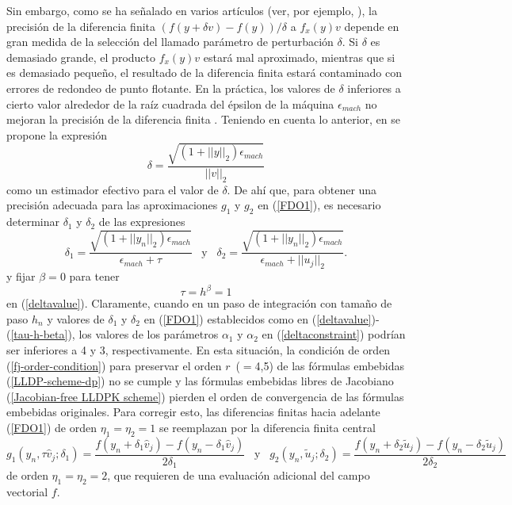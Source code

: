 Sin embargo, como se ha señalado en varios artículos (ver, por ejemplo, \cite{chan1984nonlinearly,knoll2004jacobian}), la precisión de la diferencia finita $(f(y+\delta v)-f(y))/ \delta$ a $f_x(y)v$ depende en gran medida de la selección del llamado parámetro de perturbación $\delta$. Si $\delta$ es demasiado grande, el producto $f_x(y)v$ estará mal aproximado, mientras que si es demasiado pequeño, el resultado de la diferencia finita estará contaminado con errores de redondeo de punto flotante. En la práctica, los valores de $\delta$ inferiores a cierto valor alrededor de la raíz cuadrada del épsilon de la máquina  $\epsilon_{mach}$ no mejoran la precisión de la diferencia finita \cite{knoll2004jacobian}.
Teniendo en cuenta lo anterior, en \cite{knoll2004jacobian} se propone la expresión
\[ \delta = \frac{\sqrt{(1+||y||_2)\epsilon_{mach}}}{||v||_2} \]
como un estimador efectivo para el valor de $\delta$. De ahí que, para obtener una precisión adecuada para las aproximaciones $g_1$ y $g_2$ en (\ref{FDO1}), es necesario determinar $\delta_1$ y $\delta_2$ de las expresiones
\begin{equation} \label{deltavalue}
	\delta_1 = \frac{\sqrt{(1+||y_n||_2)\epsilon_{mach}}}{\epsilon_{mach}+\tau}
	\;\;\; \text{y} \;\;\; \delta_2 = \frac{\sqrt{(1+||y_n||_2)\epsilon_{mach}}}{\epsilon_{mach}+||u_j||_2}.
\end{equation}
y fijar $\beta=0$ para tener
\begin{equation}
	\tau = h^\beta=1 \label{tau-h-beta}
\end{equation}
en (\ref{deltavalue}). Claramente, cuando en un paso de integración con tamaño de paso $h_n$ y valores de $\delta_1$ y $\delta_2$ en (\ref{FDO1}) establecidos como en (\ref{deltavalue})-(\ref{tau-h-beta}), los valores de los parámetros $ \alpha_1$ y $\alpha_2$ en (\ref{deltaconstraint}) podrían ser inferiores a 4 y 3, respectivamente. En esta situación, la condición de orden (\ref{fj-order-condition}) para preservar el orden $r$~($=$4,5) de las fórmulas embebidas (\ref{LLDP-scheme-dp}) no se cumple y las fórmulas embebidas libres de Jacobiano (\ref{Jacobian-free LLDPK scheme}) pierden el orden de convergencia de las fórmulas embebidas originales. Para corregir esto, las diferencias finitas hacia adelante (\ref{FDO1}) de orden $\eta_1=\eta_2=1$ se reemplazan por la diferencia finita central
\begin{equation*}
	g_1(y_n,\tau \widehat{v}_j;\delta_1)=\frac{f(y_n+\delta_1\widehat{v}_j)-f(y_n-\delta_1 \widehat{v}_j)}{2\delta_1}  \;\;\; \text{y} \;\;\; g_2(y_n,\widetilde{u}_j;\delta_2)=\frac{f(y_n+\delta_2  \widetilde{u}_j)-f(y_n-\delta_2 \widetilde{u}_j)}{2\delta_2}
\end{equation*}
de orden $\eta_1=\eta_2=2$, que requieren de una evaluación adicional del campo vectorial $f$.

